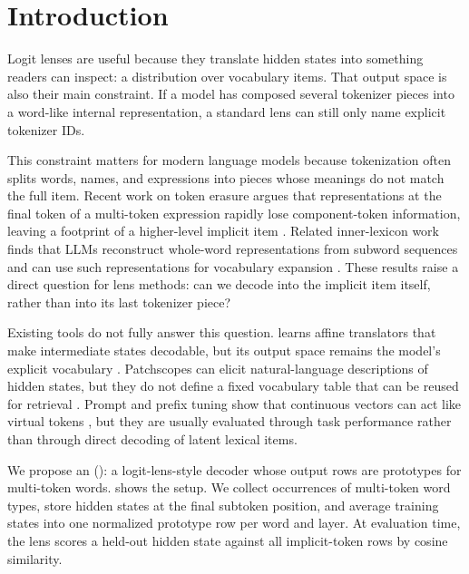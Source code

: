 \section{Introduction}
\label{sec:introduction}

Logit lenses are useful because they translate hidden states into something readers can inspect: a distribution over vocabulary items. That output space is also their main constraint. If a model has composed several tokenizer pieces into a word-like internal representation, a standard lens can still only name explicit tokenizer IDs.

This constraint matters for modern language models because tokenization often splits words, names, and expressions into pieces whose meanings do not match the full item. Recent work on token erasure argues that representations at the final token of a multi-token expression rapidly lose component-token information, leaving a footprint of a higher-level implicit item \citep{feucht2024token}. Related inner-lexicon work finds that LLMs reconstruct whole-word representations from subword sequences and can use such representations for vocabulary expansion \citep{kaplan2025tokens}. These results raise a direct question for lens methods: can we decode into the implicit item itself, rather than into its last tokenizer piece?

Existing tools do not fully answer this question. \tunedlens learns affine translators that make intermediate states decodable, but its output space remains the model's explicit vocabulary \citep{belrose2023eliciting}. Patchscopes can elicit natural-language descriptions of hidden states, but they do not define a fixed vocabulary table that can be reused for retrieval \citep{ghandeharioun2024patchscopes}. Prompt and prefix tuning show that continuous vectors can act like virtual tokens \citep{lester2021power,li2021prefix,liu2022ptuning}, but they are usually evaluated through task performance rather than through direct decoding of latent lexical items.

We propose an \methodname (\itl): a logit-lens-style decoder whose output rows are prototypes for multi-token words.  shows the setup. We collect occurrences of multi-token word types, store hidden states at the final subtoken position, and average training states into one normalized prototype row per word and layer. At evaluation time, the lens scores a held-out hidden state against all implicit-token rows by cosine similarity.

